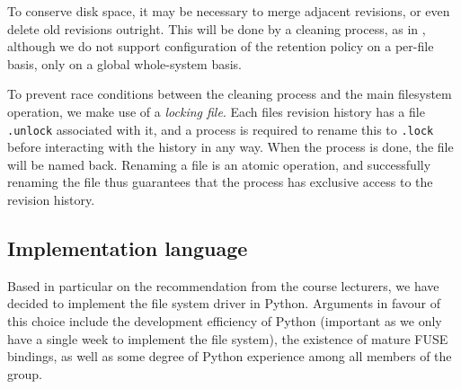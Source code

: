 \documentclass[12pt]{article}
\begin{document}
To conserve disk space, it may be necessary to merge adjacent
revisions, or even delete old revisions outright.  This will be done
by a cleaning process, as in \cite{319159}, although we do not support
configuration of the retention policy on a per-file basis, only on a
global whole-system basis.

To prevent race conditions between the cleaning process and the main
filesystem operation, we make use of a \textit{locking file}.  Each
files revision history has a file \texttt{.unlock} associated with it,
and a process is required to rename this to \texttt{.lock} before
interacting with the history in any way.  When the process is done,
the file will be named back.  Renaming a file is an atomic operation,
and successfully renaming the file thus guarantees that the process
has exclusive access to the revision history.\cite{Santry:1999gf}

\subsection{Implementation language}

Based in particular on the recommendation from the course lecturers,
we have decided to implement the file system driver in Python.
Arguments in favour of this choice include the development efficiency
of Python (important as we only have a single week to implement the
file system), the existence of mature FUSE bindings, as well as some
degree of Python experience among all members of the group.



 
\end{document}
